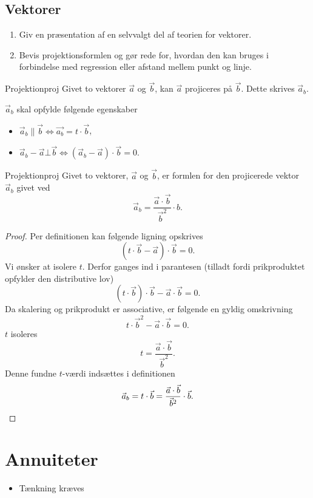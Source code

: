 \documentclass{article}
\begin{document}
\begin{tcolorbox}
	\section{Vektorer}
	\tcblower
	\begin{enumerate}
		\item Giv en præsentation af en selvvalgt del af teorien for vektorer.
		\item Bevis projektionsformlen og gør rede for, hvordan den kan bruges
			i forbindelse med regression eller afstand mellem punkt og linje.
	\end{enumerate}
\end{tcolorbox}

\begin{definition}{Projektion}{proj}
	Givet to vektorer $\vec{a}$ og $\vec{b}$, kan $\vec{a}$ projiceres på
	$\vec{b}$. Dette skrives $\vec{a}_b$.

	$\vec{a}_b$ skal opfylde følgende egenskaber
	\begin{itemize}
		\item $\vec{a}_b \parallel \vec{b} \iff \vec{a_b} = t \cdot \vec{b}$,
		\item $\vec{a}_b - \vec{a} \bot \vec{b} \iff (\vec{a}_b - \vec{a}) \cdot \vec{b} = 0$.
	\end{itemize}
\end{definition}

\begin{theorem}{Projektion}{proj}
	Givet to vektorer, $\vec{a}$ og $\vec{b}$, er formlen for den projicerede
	vektor $\vec{a}_b$ givet ved 
	\[
		\vec{a}_b = \frac{\vec{a} \cdot \vec{b}}{\vec{b}^2} \cdot b.
	\] 
\end{theorem}

\begin{proof}
Per definitionen kan følgende ligning opskrives
\[
	(t \cdot \vec{b} - \vec{a}) \cdot \vec{b} = 0.
\] 
Vi ønsker at isolere $t$. Derfor ganges ind i parantesen (tilladt fordi
prikproduktet opfylder den distributive lov)
\[
	(t \cdot \vec{b}) \cdot \vec{b} - \vec{a} \cdot \vec{b} = 0.
\] 
Da skalering og prikprodukt er associative, er følgende en gyldig omskrivning
\[
	t \cdot \vec{b}^2 - \vec{a} \cdot \vec{b} = 0.
\] 
$t$ isoleres
\[
	t = \frac{\vec{a} \cdot \vec{b}}{\vec{b}^2}.
\] 
Denne fundne $t$-værdi indsættes i definitionen
\[
	\vec{a}_b = t \cdot \vec{b} = \frac{\vec{a} \cdot \vec{b}}{\vec{b}^2} \cdot \vec{b}.\qedhere
\] 
\end{proof}

\section{Annuiteter}
\begin{itemize}
	\item Tænkning kræves
\end{itemize}
\end{document}
